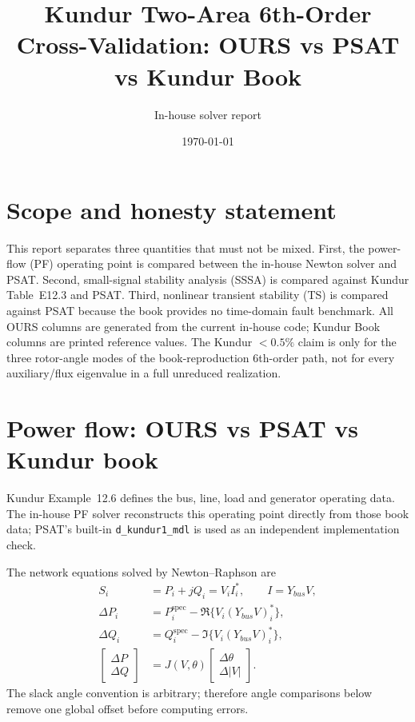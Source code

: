 \documentclass[11pt,a4paper]{article}
\title{Kundur Two-Area 6th-Order Cross-Validation: OURS vs PSAT vs Kundur Book}
\author{In-house solver report}
\date{\today}
\begin{document}
\maketitle

\section*{Scope and honesty statement}
This report separates three quantities that must not be mixed.  First, the
power-flow (PF) operating point is compared between the in-house Newton solver
and PSAT.  Second, small-signal stability analysis (SSSA) is compared against
Kundur Table~E12.3 and PSAT.  Third, nonlinear transient stability (TS) is
compared against PSAT because the book provides no time-domain fault benchmark.
All OURS columns are generated from the current in-house code; Kundur Book
columns are printed reference values.  The Kundur $<0.5\%$ claim is only for
the three rotor-angle modes of the book-reproduction 6th-order path, not for
every auxiliary/flux eigenvalue in a full unreduced realization.

\section{Power flow: OURS vs PSAT vs Kundur book}
Kundur Example~12.6 defines the bus, line, load and generator operating data.
The in-house PF solver reconstructs this operating point directly from those
book data; PSAT's built-in \texttt{d\_kundur1\_mdl} is used as an independent
implementation check.

The network equations solved by Newton--Raphson are
\begin{align}
S_i &= P_i+jQ_i = V_i I_i^*, \qquad I = Y_{bus}V,\\
\Delta P_i &= P_i^{\mathrm{spec}} - \Re\{V_i(Y_{bus}V)_i^*\},\\
\Delta Q_i &= Q_i^{\mathrm{spec}} - \Im\{V_i(Y_{bus}V)_i^*\},\\
\begin{bmatrix}\Delta P\\ \Delta Q\end{bmatrix}
&= J(V,\theta)
\begin{bmatrix}\Delta\theta\\ \Delta |V|\end{bmatrix}.
\end{align}
The slack angle convention is arbitrary; therefore angle comparisons below
remove one global offset before computing errors.
\end{document}
